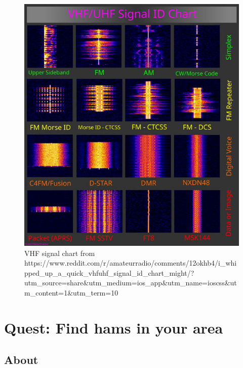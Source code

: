 \documentclass[
  letterpaper,
  DIV=11,
  numbers=noendperiod]{scrreport}
\begin{document}
\begin{figure}

{\centering \includegraphics{include/img/vhf-signal-chart-scaled.jpg}

}

\caption{VHF signal chart from
https://www.reddit.com/r/amateurradio/comments/12okhb4/i\_whipped\_up\_a\_quick\_vhfuhf\_signal\_id\_chart\_might/?utm\_source=share\&utm\_medium=ios\_app\&utm\_name=ioscss\&utm\_content=1\&utm\_term=10}

\end{figure}

\hypertarget{quest-find-hams-in-your-area}{%
\chapter*{Quest: Find hams in your
area}\label{quest-find-hams-in-your-area}}


\hypertarget{about-3}{%
\section*{About}\label{about-3}}
\end{document}

